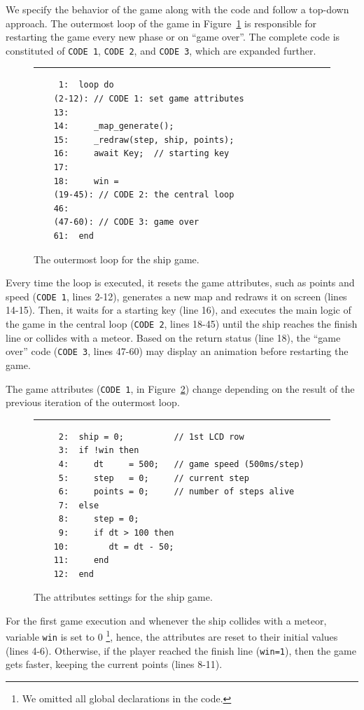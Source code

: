 \documentclass[11pt,a4paper]{article}
\newcommand{\2}{\;\;}
\newcommand{\5}{\;\;\;\;\;}
\newcommand{\code}[1] {{\small{\texttt{#1}}}}
\begin{document}
We specify the behavior of the game along with the code and follow a top-down 
approach.
The outermost loop of the game in Figure~\ref{lst:demos:ship:1} is responsible 
for restarting the game every new phase or on ``game over''.
The complete code is constituted of \code{CODE~1}, \code{CODE~2}, and 
\code{CODE~3}, which are expanded further.

\begin{figure}[h]
\rule{15cm}{0.37pt}
{\small
\begin{verbatim}
     1:  loop do
    (2-12): // CODE 1: set game attributes
    13:
    14:     _map_generate();
    15:     _redraw(step, ship, points);
    16:     await Key;  // starting key
    17:
    18:     win =
    (19-45): // CODE 2: the central loop
    46:
    (47-60): // CODE 3: game over
    61:  end
\end{verbatim}
}
\caption{ The outermost loop for the ship game.
\label{lst:demos:ship:1}
}
\end{figure}

Every time the loop is executed, it resets the game attributes, such as points 
and speed (\code{CODE 1}, lines 2-12), generates a new map and redraws it on 
screen (lines 14-15).
Then, it waits for a starting key (line 16), and executes the main logic of the 
game in the central loop (\code{CODE 2}, lines 18-45) until the ship reaches 
the finish line or collides with a meteor.
Based on the return status (line 18), the ``game over'' code (\code{CODE 3}, 
lines 47-60) may display an animation before restarting the game.

The game attributes (\code{CODE 1}, in Figure~\ref{lst:demos:ship:2}) change 
depending on the result of the previous iteration of the outermost loop.

\begin{figure}[h]
\rule{15cm}{0.37pt}
{\small
\begin{verbatim}
     2:  ship = 0;          // 1st LCD row
     3:  if !win then
     4:     dt     = 500;   // game speed (500ms/step)
     5:     step   = 0;     // current step
     6:     points = 0;     // number of steps alive
     7:  else
     8:     step = 0;
     9:     if dt > 100 then
    10:        dt = dt - 50;
    11:     end
    12:  end
\end{verbatim}
}
\caption{ The attributes settings for the ship game.
\label{lst:demos:ship:2}
}
\end{figure}

For the first game execution and whenever the ship collides with a meteor, 
variable \code{win} is set to 0%
\footnote{We omitted all global declarations in the code.},
hence, the attributes are reset to their initial values (lines 4-6).
Otherwise, if the player reached the finish line (\code{win=1}), then the game 
gets faster, keeping the current points (lines 8-11).
\end{document}
